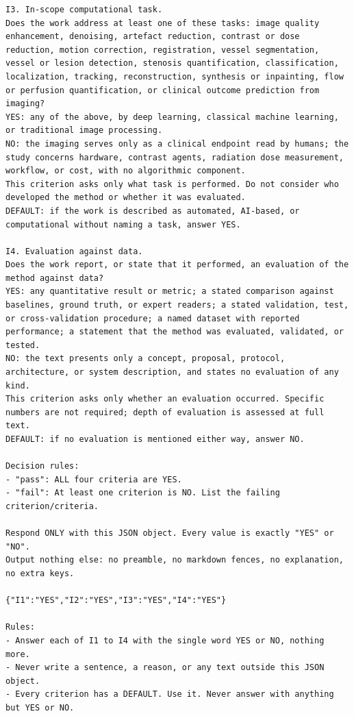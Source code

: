 \begin{lstlisting}
I3. In-scope computational task.
Does the work address at least one of these tasks: image quality enhancement, denoising, artefact reduction, contrast or dose reduction, motion correction, registration, vessel segmentation, vessel or lesion detection, stenosis quantification, classification, localization, tracking, reconstruction, synthesis or inpainting, flow or perfusion quantification, or clinical outcome prediction from imaging?
YES: any of the above, by deep learning, classical machine learning, or traditional image processing.
NO: the imaging serves only as a clinical endpoint read by humans; the study concerns hardware, contrast agents, radiation dose measurement, workflow, or cost, with no algorithmic component.
This criterion asks only what task is performed. Do not consider who developed the method or whether it was evaluated.
DEFAULT: if the work is described as automated, AI-based, or computational without naming a task, answer YES.

I4. Evaluation against data.
Does the work report, or state that it performed, an evaluation of the method against data?
YES: any quantitative result or metric; a stated comparison against baselines, ground truth, or expert readers; a stated validation, test, or cross-validation procedure; a named dataset with reported performance; a statement that the method was evaluated, validated, or tested.
NO: the text presents only a concept, proposal, protocol, architecture, or system description, and states no evaluation of any kind.
This criterion asks only whether an evaluation occurred. Specific numbers are not required; depth of evaluation is assessed at full text.
DEFAULT: if no evaluation is mentioned either way, answer NO.

Decision rules:
- "pass": ALL four criteria are YES.
- "fail": At least one criterion is NO. List the failing criterion/criteria.

Respond ONLY with this JSON object. Every value is exactly "YES" or "NO".
Output nothing else: no preamble, no markdown fences, no explanation, no extra keys.

{"I1":"YES","I2":"YES","I3":"YES","I4":"YES"}

Rules:
- Answer each of I1 to I4 with the single word YES or NO, nothing more.
- Never write a sentence, a reason, or any text outside this JSON object.
- Every criterion has a DEFAULT. Use it. Never answer with anything but YES or NO.
\end{lstlisting}

